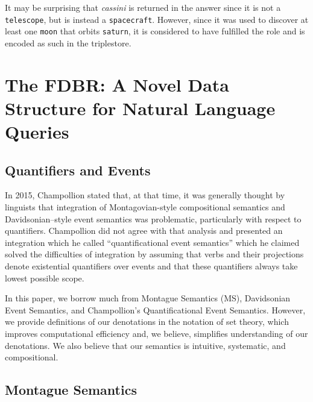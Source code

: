 \documentclass[../main.tex]{subfiles}
\begin{document}
\begin{refsection}
\examplespacing


\examplespacing

\noindent It may be surprising that \textit{cassini} is returned in the answer since it is not a \texttt{telescope}, but is instead a \texttt{spacecraft}.  However, since it was used to discover at least one \texttt{moon} that orbits \texttt{saturn}, it is considered to have fulfilled the  role and is encoded as such in the triplestore.

\section{The FDBR: A Novel Data Structure for Natural Language Queries}
\label{webist2019journal:album}

\subsection{Quantifiers and Events}
\label{webist2019journal:quant}
In 2015, Champollion \cite{champollion2015interaction} stated that, at that time, it was generally thought by linguists that integration of Montagovian-style compositional semantics and Davidsonian–style event semantics \cite{parsons1990events,davidson1967logical} was problematic, particularly with respect to quantifiers. Champollion did not agree with that analysis and presented an integration which he called ``quantificational event semantics'' which he claimed solved the difficulties of integration by assuming that verbs and their projections denote existential quantifiers over events and that these quantifiers always take lowest possible scope.

In this paper, we borrow much from Montague Semantics (MS), Davidsonian Event Semantics,
and Champollion's Quantificational Event Semantics. However, we provide definitions of our
denotations in the notation of set theory, which improves computational efficiency and, we
believe, simplifies understanding of our denotations. We also believe that our semantics is
intuitive, systematic, and compositional.

\subsection{Montague Semantics}


\end{refsection}
\end{document}
